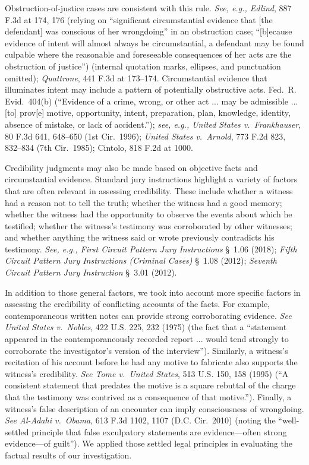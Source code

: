 Obstruction-of-justice cases are consistent with this rule.
\textit{See, e.g., Edlind}, 887 F.3d at 174, 176 (relying on “significant circumstantial evidence that [the defendant] was conscious of her wrongdoing” in an obstruction case; “[b]ecause evidence of intent will almost always be circumstantial, a defendant may be found culpable where the reasonable and foreseeable consequences of her acts are the obstruction of justice”) (internal quotation marks, ellipses, and punctuation omitted);
\textit{Quattrone}, 441 F.3d at 173--174.
Circumstantial evidence that illuminates intent may include a pattern of potentially obstructive acts. Fed.~R. Evid.~404(b) (“Evidence of a crime, wrong, or other act ... may be admissible ... [to] prov[e] motive, opportunity, intent, preparation, plan, knowledge, identity, absence of mistake, or lack of accident.”);
\textit{see, e.g., United States v.\ Frankhauser}, 80 F.3d 641, 648--650 (1st Cir.~1996);
\textit{United States v.\ Arnold}, 773 F.2d 823, 832--834 (7th Cir.~1985);
Cintolo, 818 F.2d at 1000.

Credibility judgments may also be made based on objective facts and circumstantial evidence.
Standard jury instructions highlight a variety of factors that are often relevant in assessing credibility.
These include whether a witness had a reason not to tell the truth; whether the witness had a good memory;
whether the witness had the opportunity to observe the events about which he testified;
whether the witness’s testimony was corroborated by other witnesses;
and whether anything the witness said or wrote previously contradicts his testimony.
\textit{See, e.g., First Circuit Pattern Jury Instructions} \S~1.06 (2018);
\textit{Fifth Circuit Pattern Jury Instructions (Criminal Cases)} \S~1.08 (2012);
\textit{Seventh Circuit Pattern Jury Instruction} \S~3.01 (2012).

In addition to those general factors, we took into account more specific factors in assessing the credibility of conflicting accounts of the facts.
For example, contemporaneous written notes can provide strong corroborating evidence.
\textit{See United States v.\ Nobles}, 422 U.S. 225, 232 (1975) (the fact that a “statement appeared in the contemporaneously recorded report ... would tend strongly to corroborate the investigator’s version of the interview”).
Similarly, a witness’s recitation of his account before he had any motive to fabricate also supports the witness’s credibility.
\textit{See Tome v.\ United States}, 513 U.S. 150, 158 (1995) (“A consistent statement that predates the motive is a square rebuttal of the charge that the testimony was contrived as a consequence of that motive.”).
Finally, a witness’s false description of an encounter can imply consciousness of wrongdoing.
\textit{See Al-Adahi v.\ Obama}, 613 F.3d 1102, 1107 (D.C. Cir.~2010) (noting the “well-settled principle that false exculpatory statements are evidence---often strong evidence---of guilt”).
We applied those settled legal principles in evaluating the factual results of our investigation.
